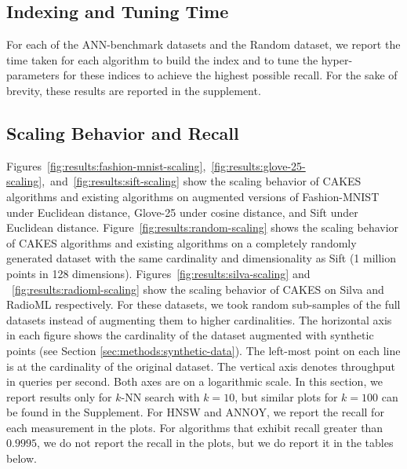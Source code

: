 \subsection{Indexing and Tuning Time}
\label{sec:results:indexing-and-tuning-time}

For each of the ANN-benchmark datasets and the Random dataset, we report the time taken for each algorithm to build the index and to tune the hyper-parameters for these indices to achieve the highest possible recall. For the sake of brevity, these results are reported in the supplement.


\subsection{Scaling Behavior and Recall}
\label{sec:results:scaling-behavior-and-recall}

Figures~\ref{fig:results:fashion-mnist-scaling},~\ref{fig:results:glove-25-scaling},~and~\ref{fig:results:sift-scaling} show the scaling behavior of CAKES algorithms and existing algorithms on augmented versions of Fashion-MNIST under Euclidean distance,
Glove-25 under cosine distance, and
Sift under Euclidean distance.
Figure~\ref{fig:results:random-scaling} shows the scaling behavior of CAKES algorithms and existing algorithms on a completely randomly generated dataset with the same cardinality and dimensionality as Sift (1 million points in 128 dimensions).
Figures~\ref{fig:results:silva-scaling} and ~\ref{fig:results:radioml-scaling} show the scaling behavior of CAKES on Silva and RadioML respectively.
For these datasets, we took random sub-samples of the full datasets instead of augmenting them to higher cardinalities.
The horizontal axis in each figure shows the cardinality of the dataset augmented with synthetic points (see Section \ref{sec:methods:synthetic-data}).
The left-most point on each line is at the cardinality of the original dataset.
The vertical axis denotes throughput in queries per second.
Both axes are on a logarithmic scale.
In this section, we report results only for $k$-NN search with $k = 10$, but similar plots for $k = 100$ can be found in the Supplement.
For HNSW and ANNOY, we report the recall for each measurement in the plots. For algorithms that exhibit recall greater than $0.9995$, we do not report the recall in the plots, but we do report it in the tables below.

